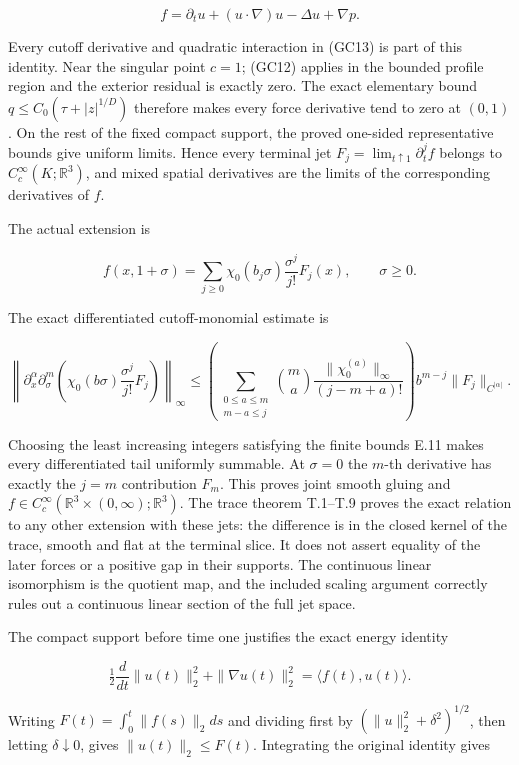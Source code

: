 \documentclass[10pt,a4paper]{article}
\begin{document}
\[
f=\partial_tu+(u\cdot\nabla)u-\Delta u+\nabla p.
\tag{GC14}
\]

Every cutoff derivative and quadratic interaction in (GC13) is part of this identity. Near the singular point \(c=1\); (GC12) applies in the bounded profile region and the exterior residual is exactly zero. The exact elementary bound \(q\le C_0(\tau+|z|^{1/D})\) therefore makes every force derivative tend to zero at \((0,1)\). On the rest of the fixed compact support, the proved one-sided representative bounds give uniform limits. Hence every terminal jet \(F_j=\lim_{t\uparrow1}\partial_t^jf\) belongs to \(C_c^\infty(K;\mathbb R^3)\), and mixed spatial derivatives are the limits of the corresponding derivatives of \(f\).

The actual extension is

\[
f(x,1+\sigma)=\sum_{j\ge0}\chi_0(b_j\sigma)
\frac{\sigma^j}{j!}F_j(x),\qquad\sigma\ge0.
\]

The exact differentiated cutoff-monomial estimate is

\[
\left\|\partial_x^\alpha\partial_\sigma^m
\left(\chi_0(b\sigma)\frac{\sigma^j}{j!}F_j\right)\right\|_\infty
\le\left(\sum_{\substack{0\le a\le m\\m-a\le j}}
\binom ma\frac{\|\chi_0^{(a)}\|_\infty}{(j-m+a)!}\right)
b^{m-j}\|F_j\|_{C^{|\alpha|}}.
\]

Choosing the least increasing integers satisfying the finite bounds E.11 makes every differentiated tail uniformly summable. At \(\sigma=0\) the \(m\)-th derivative has exactly the \(j=m\) contribution \(F_m\). This proves joint smooth gluing and \(f\in C_c^\infty(\mathbb R^3\times(0,\infty);\mathbb R^3)\). The trace theorem T.1--T.9 proves the exact relation to any other extension with these jets: the difference is in the closed kernel of the trace, smooth and flat at the terminal slice. It does not assert equality of the later forces or a positive gap in their supports. The continuous linear isomorphism is the quotient map, and the included scaling argument correctly rules out a continuous linear section of the full jet space.

The compact support before time one justifies the exact energy identity

\[
\tfrac12\frac d{dt}\|u(t)\|_2^2+\|\nabla u(t)\|_2^2
=\langle f(t),u(t)\rangle.
\]

Writing \(F(t)=\int_0^t\|f(s)\|_2ds\) and dividing first by \((\|u\|_2^2+\delta^2)^{1/2}\), then letting \(\delta\downarrow0\), gives \(\|u(t)\|_2\le F(t)\). Integrating the original identity gives
\end{document}
